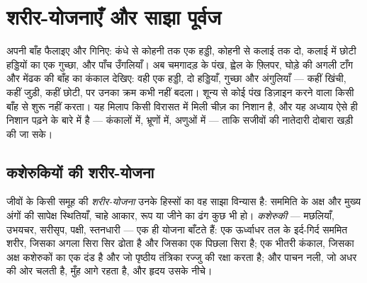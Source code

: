 \chapter{शरीर-योजनाएँ और साझा पूर्वज}\label{ch:g10:common-ancestry}

अपनी बाँह फैलाइए और गिनिए: कंधे से कोहनी तक एक हड्डी, कोहनी से कलाई तक
दो, कलाई में छोटी हड्डियों का एक गुच्छा, और पाँच उँगलियाँ। अब चमगादड़ के
पंख, ह्वेल के फ़्लिपर, घोड़े की अगली टाँग और मेंढक की बाँह का कंकाल
देखिए: वही एक हड्डी, दो हड्डियाँ, गुच्छा और अंगुलियाँ --- कहीं खिंची,
कहीं जुड़ी, कहीं छोटी, पर उनका क्रम कभी नहीं बदला। शून्य से कोई पंख
डिज़ाइन करने वाला किसी बाँह से शुरू नहीं करता। यह मिलाप किसी विरासत में
मिली चीज़ का निशान है, और यह अध्याय ऐसे ही निशान पढ़ने के बारे में है ---
कंकालों में, भ्रूणों में, अणुओं में --- ताकि सजीवों की नातेदारी दोबारा
खड़ी की जा सके।

\section{कशेरुकियों की शरीर-योजना}

\begin{definition}[शरीर-योजना]\label{def:g10:common-ancestry:bodyplan}
जीवों के किसी समूह की \emph{शरीर-योजना} उनके हिस्सों का
वह साझा विन्यास है: सममिति के अक्ष और मुख्य अंगों की सापेक्ष स्थितियाँ,
चाहे आकार, रूप या जीने का ढंग कुछ भी हो। \emph{कशेरुकी}
--- मछलियाँ, उभयचर, सरीसृप, पक्षी, स्तनधारी --- एक ही योजना बाँटते हैं:
एक ऊर्ध्वाधर तल के इर्द-गिर्द सममित शरीर, जिसका अगला सिरा सिर ढोता है और
जिसका एक पिछला सिरा है; एक भीतरी कंकाल, जिसका अक्ष कशेरुकों का एक दंड है
और जो पृष्ठीय तंत्रिका रज्जु की रक्षा करता है; और पाचन नली, जो अधर की ओर
चलती है, मुँह आगे रहता है, और हृदय उसके नीचे।
\end{definition}

